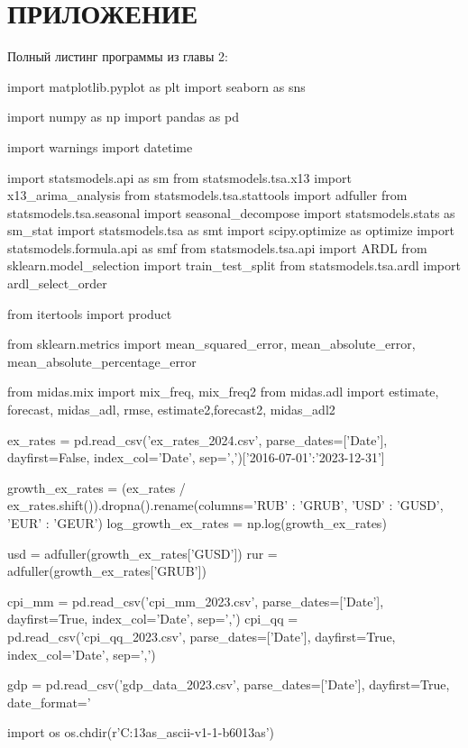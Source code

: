 \documentclass[a4paper, 12pt]{extarticle}
\numberwithin{equation}{subsection}
\begin{document}
	\section*{ПРИЛОЖЕНИЕ}
	Полный листинг программы из главы 2:
	\begin{python}
		import matplotlib.pyplot as plt
		import seaborn as sns
		
		import numpy as np
		import pandas as pd
		
		import warnings
		import datetime
		
		import statsmodels.api as sm
		from statsmodels.tsa.x13 import x13_arima_analysis
		from statsmodels.tsa.stattools import adfuller
		from statsmodels.tsa.seasonal import seasonal_decompose
		import statsmodels.stats as sm_stat
		import statsmodels.tsa as smt
		import scipy.optimize as optimize
		import statsmodels.formula.api as smf
		from statsmodels.tsa.api import ARDL
		from sklearn.model_selection import train_test_split
		from statsmodels.tsa.ardl import ardl_select_order
		
		from itertools import product
		
		from sklearn.metrics import mean_squared_error, mean_absolute_error, mean_absolute_percentage_error
		
		
		from midas.mix import mix_freq, mix_freq2
		from midas.adl import estimate, forecast, midas_adl, rmse, estimate2,forecast2, midas_adl2
		
		ex_rates = pd.read_csv('ex_rates_2024.csv', parse_dates=['Date'], dayfirst=False, index_col='Date', sep=',')['2016-07-01':'2023-12-31']
		
		growth_ex_rates = (ex_rates / ex_rates.shift()).dropna().rename(columns={'RUB' : 'GRUB', 'USD' : 'GUSD', 'EUR' : 'GEUR'})
		log_growth_ex_rates = np.log(growth_ex_rates)
		
		usd = adfuller(growth_ex_rates['GUSD'])
		rur = adfuller(growth_ex_rates['GRUB'])
		
		cpi_mm = pd.read_csv('cpi_mm_2023.csv', parse_dates=['Date'], dayfirst=True, index_col='Date', sep=',')
		cpi_qq = pd.read_csv('cpi_qq_2023.csv', parse_dates=['Date'], dayfirst=True, index_col='Date', sep=',')
		
		gdp = pd.read_csv('gdp_data_2023.csv', parse_dates=['Date'], dayfirst=True, date_format='%
		
		import os
		os.chdir(r'C:\Users\bzzdwn\Downloads\x13as_ascii-v1-1-b60\x13as')
		

\end{python}
\end{document}
